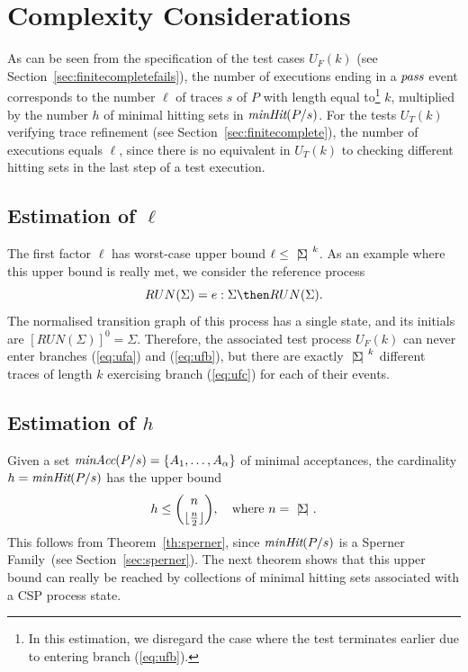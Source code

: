 \section{Complexity Considerations}
\label{sec:complexity}

As can be seen from the specification of the test cases $U_F(k)$ (see
 Section~\ref{sec:finitecompletefails}), the number of
executions ending in a ${\text{\it pass}}$ event corresponds to the number $\ell$ of
traces $s$ of $P$ with length equal to\footnote{In this estimation, we
disregard the case where the test terminates earlier due to entering branch
(\ref{eq:ufb}).} $k$, multiplied by the number $h$ of minimal hitting sets in
$\text{\it minHit}(P/s)$. For
the tests $U_T(k)$ verifying trace refinement (see
Section~\ref{sec:finitecomplete}), the number of executions equals $\ell$,
since there is no equivalent in $U_T(k)$ to checking different hitting sets
in the last step of a test execution.

\subsection{Estimation of $\ell$}
The first factor $\ell$ has worst-case upper bound $\ell\le {~|\! \Sigma\!|~}^k$.
As an example where this upper bound is really met, we consider the reference
process
\[
RUN(\Sigma) = e:\Sigma \then RUN(\Sigma).
\]
The normalised transition graph of this process has a single state, and its initials
are $[RUN(\Sigma)]^0 = \Sigma$. Therefore, the associated test process $U_F(k)$ can
never enter branches (\ref{eq:ufa}) and (\ref{eq:ufb}), but there are exactly
${~|\! \Sigma\!|~}^k$ different traces of length $k$ exercising branch (\ref{eq:ufc})
for each of their events.

\subsection{Estimation of $h$}
Given a set $\text{\it minAcc}(P/s) = \{ A_1,\dots, A_\alpha \}$ of   minimal
acceptances, the cardinality   $h = \text{\it minHit}(P/s)$ has the upper bound
\[
h \le \binom{n}{\lfloor\frac{n}{2}\rfloor}, \quad \text{where $n = {~|\! \Sigma\!|~}$.}
\]
This follows from Theorem~\ref{th:sperner}, since $\text{\it minHit}(P/s)$ is a
Sperner Family~(see Section~\ref{sec:sperner}). The next theorem shows that
this upper bound can really be reached by collections of minimal hitting sets
associated with a CSP process state.

